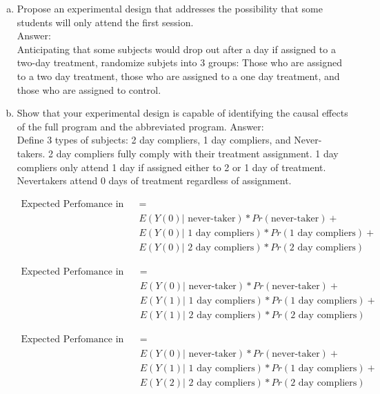 \documentclass[11pt,notitlepage]{article}\usepackage[]{graphicx}\usepackage[]{color}
\begin{document}
\begin{enumerate}[a)]
\item Propose an experimental design that addresses the possibility that some students
will only attend the first session.\\
Answer:\\
Anticipating that some subjects would drop out after a day if assigned to a two-day treatment, randomize subjets into 3 groups:  Those who are assigned to a two day treatment, those who are assigned to a one day treatment, and those who are assigned to control.  

\item Show that your experimental design is capable of identifying the causal effects of the
full program and the abbreviated program.
Answer:\\
Define 3 types of subjects: 2 day compliers, 1 day compliers, and Never-takers.  2 day compliers fully comply with their treatment assignment.  1 day compliers only attend 1 day if assigned either to 2 or 1 day of treatment.  Nevertakers attend 0 days of treatment regardless of assignment.

\begin{align*}
\text{Expected Perfomance in Control (EP, Control)} &= \\
&E(Y(0)|\text{ never-taker})*Pr(\text{never-taker}) + \\
&E(Y(0)|\text{ 1 day compliers})*Pr(\text{1 day compliers}) + \\
&E(Y(0)|\text{ 2 day compliers})*Pr(\text{2 day compliers})
\end{align*}

\begin{align*}
\text{Expected Perfomance in 1-day group (EP, 1-day)} &= \\
&E(Y(0)|\text{ never-taker})*Pr(\text{never-taker}) + \\
&E(Y(1)|\text{ 1 day compliers})*Pr(\text{1 day compliers}) + \\
&E(Y(1)|\text{ 2 day compliers})*Pr(\text{2 day compliers})
\end{align*}

\begin{align*}
\text{Expected Perfomance in 2-day group (EP, 2-day)} &= \\
&E(Y(0)|\text{ never-taker})*Pr(\text{never-taker}) + \\
&E(Y(1)|\text{ 1 day compliers})*Pr(\text{1 day compliers}) + \\
&E(Y(2)|\text{ 2 day compliers})*Pr(\text{2 day compliers})
\end{align*}


\end{enumerate}
\end{document}
